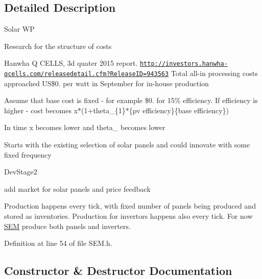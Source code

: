 \subsection{Detailed Description}
\begin{DoxyRefDesc}{Solar W\+P}
\item[\hyperlink{wp__wp000005}{Solar W\+P}]Research for the structure of costs\end{DoxyRefDesc}


Hanwha Q C\+E\+L\+L\+S, 3d quater 2015 report. \href{http://investors.hanwha-qcells.com/releasedetail.cfm?ReleaseID=943563}{\tt http\+://investors.\+hanwha-\/qcells.\+com/releasedetail.\+cfm?\+Release\+I\+D=943563} Total all-\/in processing costs approached U\+S\$0. per watt in September for in-\/house production

Assume that base cost is fixed -\/ for example \$0. for 15\% efficiency. If efficiency is higher -\/ cost becomes x$\ast$(1+theta\+\_\+\{1\}$\ast$\{pv efficiency\}\{base efficiency\})

In time x becomes lower and theta\+\_ becomes lower

Starts with the existing selection of solar panels and could innovate with some fixed frequency

\begin{DoxyRefDesc}{Dev\+Stage2}
\item[\hyperlink{_dev_stage2__DevStage2000022}{Dev\+Stage2}]add market for solar panels and price feedback \end{DoxyRefDesc}


Production happens every tick, with fixed number of panels being produced and stored as inventories. Production for invertors happens also every tick. For now \hyperlink{classsolar__core_1_1_s_e_m}{S\+E\+M} produce both panels and inverters. 

Definition at line 54 of file S\+E\+M.\+h.



\subsection{Constructor \& Destructor Documentation}
\hypertarget{classsolar__core_1_1_s_e_m_a60d13fcadec26853d8461d32eefb97da}{}
